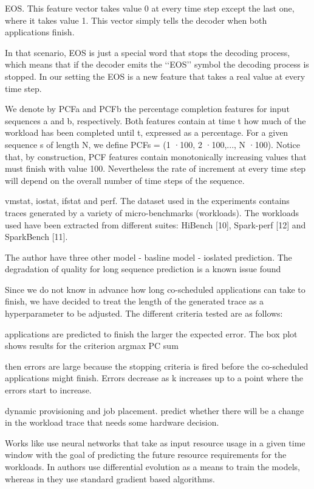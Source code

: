 \documentclass[UTF8]{article}
\begin{document}
    EOS. This feature vector takes value 0 at every time step except the last one, where it takes value 1. This vector simply tells the decoder when both applications finish.
    
    In that scenario, EOS is just a special word that stops the decoding process, which means that if the decoder emits the ‘‘EOS’’ symbol the decoding process is stopped. In our setting the EOS is a new feature that takes a real value at every time step.
    
    We denote by PCFa and PCFb the percentage completion features for input sequences a and b, respectively. Both features contain at time t how much of the workload has been completed until t, expressed as a percentage. For a given sequence s of length N, we define PCFs = (1 ·100, 2 ·100,..., N ·100). Notice that, by construction, PCF features contain monotonically increasing values that must finish with value 100. Nevertheless the rate of increment at every time step will depend on the overall number of time steps of the sequence.
    
    vmstat, iostat, ifstat and perf. The dataset used in the experiments contains traces generated by a variety of micro-benchmarks (workloads). The workloads used have been extracted from different suites: HiBench [10], Spark-perf [12] and SparkBench [11]. 
    
    The author have three other model - basline model - ioslated prediction. The degradation of quality for long sequence prediction is a known issue found
    
    Since we do not know in advance how long co-scheduled applications can take to finish, we have decided to treat the length of the generated trace as a hyperparameter to be adjusted. The different criteria tested are as follows:
    
    applications are predicted to finish the larger the expected error. The box plot shows results for the criterion argmax PC sum
    
    then errors are large because the stopping criteria is fired before the co-scheduled applications might finish. Errors decrease as k increases up to a point where the errors start to increase.
    
    dynamic provisioning and job placement. predict whether there will be a change in the workload trace that needs some hardware decision. 
    
    Works like \cite{islam2012empirical, kumar2018workload} use neural networks that take as input resource usage in a given time window with the goal of predicting the future resource requirements for the workloads. In authors use differential evolution as a means to train the models, whereas in they use standard gradient based algorithms.
    
\end{document}
